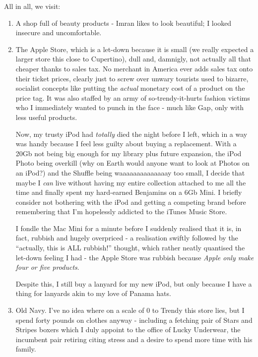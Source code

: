 \documentclass[a5paper,titlepage,11pt]{book}
\begin{document}
All in all, we visit:
\begin{enumerate}
\item A shop full of beauty products - Imran likes to look beautiful; I looked insecure and uncomfortable.

\item The Apple Store, which is a let-down because it is small (we really expected a larger store this close to Cupertino), dull and, damnigly, not actually all that cheaper thanks to sales tax. No merchant in America ever adds sales tax onto their ticket prices, clearly just to screw over unwary tourists used to bizarre, socialist concepts like putting the \emph{actual} monetary cost of a product on the price tag.  It was also staffed by an army of so-trendy-it-hurts fashion victims who I immediately wanted to punch in the face - much like Gap, only with less useful products.

Now, my trusty iPod had \emph{totally} died the night before I left, which in a way was handy because I feel less guilty about buying a replacement.  With a 20Gb not being big enough for my library plus future expansion, the iPod Photo being overkill (why on Earth would anyone want to look at Photos on an iPod?) and the Shuffle being waaaaaaaaaaaaaay too small, I decide that maybe I \emph{can} live without having my entire collection attached to me all the time and finally spent my hard-earned Benjamins on a 6Gb Mini.  I briefly consider not bothering with the iPod and getting a competing brand before remembering that I'm hopelessly addicted to the iTunes Music Store.

I fondle the Mac Mini for a minute before I suddenly realised that it is, in fact, rubbish and hugely overpriced - a realisation swiftly followed by the ``actually, this is ALL rubbish!'' thought, which rather neatly quantised the let-down feeling I had - the Apple Store was rubbish because \emph{Apple only make four or five products}.

Despite this, I still buy a lanyard for my new iPod, but only because I have a thing for lanyards akin to my love of Panama hats. 

\item Old Navy.  I've no idea where on a scale of 0 to Trendy this store lies, but I spend forty pounds on clothes anyway - including a fetching pair of Stars and Stripes boxers which I duly appoint to the office of Lucky Underwear, the incumbent pair retiring citing stress and a desire to spend more time with his family.


\end{enumerate}
\end{document}
